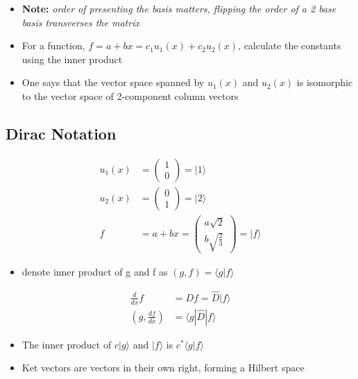 \documentclass[a4paper,11pt,normalem]{article}
\begin{document}
\begin{itemize}
\item
  \textbf{Note:} \emph{order of presenting the basis matters, flipping
  the order of a 2 base basis transverses the matrix}
\item
  For a function, \(f = a + bx = c_1u_1(x) + c_2u_2(x)\), calculate the
  constants using the inner product
\item
  One says that the vector space spanned by \(u_1(x)\) and \(u_2(x)\) is
  isomorphic to the vector space of 2-component column vectors
\end{itemize}

\subsection{Dirac Notation}\label{dirac-notation}

\[
    \begin{aligned}
    u_1(x) &= \begin{pmatrix} 1 \\ 0 \end{pmatrix} = |1\rangle \\
    u_2(x) &= \begin{pmatrix} 0 \\ 1 \end{pmatrix} = |2\rangle \\
    f &= a + bx = \begin{pmatrix} a\sqrt{2} \\ b\sqrt{\frac{2}{3}} \end{pmatrix} = |f\rangle
    \end{aligned}
\]

\begin{itemize}
\item
  denote inner product of g and f as \((g,f) = \langle g | f \rangle\)
\end{itemize}

\[
    \begin{aligned}
    \frac{d}{dx}f &= Df = \hat{D}|f\rangle \\
    \left(g,\frac{df}{dx}\right) &= \langle g | \hat{D} | f \rangle
    \end{aligned}
\]

\begin{itemize}
\item
  The inner product of \(c|g\rangle\) and \(|f\rangle\) is
  \(c^* \langle g|f\rangle\)
\item
  Ket vectors are vectors in their own right, forming a Hilbert space
\end{itemize}
\end{document}
